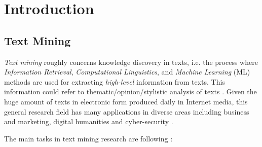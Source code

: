 
\chapter{Introduction}

\label{chap:introduction}


\newcommand{\keyword}[1]{\textbf{#1}}
\newcommand{\tabhead}[1]{\textbf{#1}}
\newcommand{\code}[1]{\texttt{#1}}
\newcommand{\file}[1]{\texttt{\bfseries#1}}
\newcommand{\option}[1]{\texttt{\itshape#1}}


\section{Text Mining} \label{chap:introduction:sec:text_mining}

\textit{Text mining} roughly concerns knowledge discovery in texts, i.e. the process where \textit{Information Retrieval}, \textit{Computational Linguistics}, and \textit{Machine Learning} (ML) methods are used for extracting \textit{high-level} information from texts. This information could refer to thematic/opinion/stylistic analysis of texts \parencite{hotho2005}. Given the huge amount of texts in electronic form produced daily in Internet media, this general research field has many applications in diverse areas including business and marketing, digital humanities and cyber-security \parencite{Weiss2010}. 

The main tasks in text mining research are following \parencite{Aggarwal2012}:

